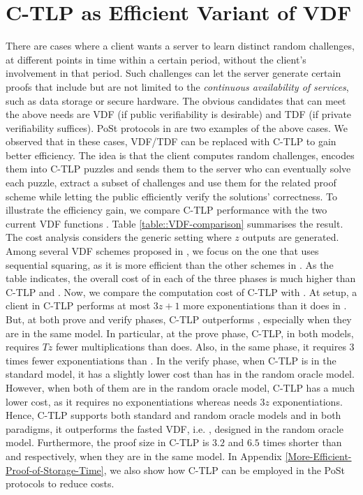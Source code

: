 \vspace{-13mm}
\section{C-TLP as Efficient Variant of VDF}\label{section::Variant-of-VDF}




There are cases where a client wants a server to learn distinct random challenges, at different points in time within a certain period, without the client's involvement in that period. Such challenges can let the server generate certain proofs that include but are not limited to the \emph{continuous availability of services}, such as data storage or secure hardware. The obvious candidates that can meet the above needs are VDF (if  public verifiability is desirable) and TDF (if   private verifiability suffices). PoSt protocols  in \cite{Storage-Time} are two examples of the above cases. We observed that in these cases, VDF/TDF can be replaced with  C-TLP to gain better efficiency. The idea is that the client computes random challenges, encodes them into C-TLP puzzles and sends them to the server who can eventually solve each puzzle, extract a subset of challenges and use them for the related proof scheme while letting the public efficiently verify the solutions' correctness. To illustrate the efficiency gain,  we compare C-TLP performance with the two current VDF functions \cite{Wesolowski19,BonehBBF18}. Table \ref{table::VDF-comparison} summarises the result. The cost analysis considers the generic setting where $z$ outputs are generated. Among several VDF schemes proposed in \cite{BonehBBF18}, we focus on the one that uses sequential squaring, as it is more efficient than the other schemes in \cite{BonehBBF18}.   As the table indicates, the overall cost of \cite{BonehBBF18} in each of the three phases is much higher than C-TLP and \cite{Wesolowski19}. Now, we compare the computation cost of C-TLP  with  \cite{Wesolowski19}.  At setup, a client  in C-TLP  performs at most $3z+1$ more exponentiations than it does in \cite{Wesolowski19}. But, at both prove and verify phases, C-TLP   outperforms \cite{BonehBBF18}, especially when they are in the same model. In particular,  at the prove phase, C-TLP, in both models,  requires $Tz$ fewer multiplications than  \cite{Wesolowski19} does. Also, in the same phase, it requires $3$ times fewer exponentiations than \cite{Wesolowski19}. In the verify phase,  when C-TLP is in the
standard model, it has a slightly lower cost than \cite{Wesolowski19} has in the random oracle model. However, when both of them are in the random oracle model, C-TLP   has a much lower cost, as it requires no exponentiations whereas  \cite{Wesolowski19} needs $3z$ exponentiations.  Hence,  C-TLP   supports both standard and random oracle models and in both paradigms, it outperforms the fasted VDF, i.e. \cite{Wesolowski19}, designed in the random oracle model. Furthermore, the  proof size in C-TLP  is $3.2$ and $6.5$ times shorter than \cite{BonehBBF18} and  \cite{Wesolowski19} respectively, when they are in the same model.  In Appendix \ref{More-Efficient-Proof-of-Storage-Time},  we also show how C-TLP can be employed in the PoSt protocols \cite{Storage-Time} to reduce   costs. 

